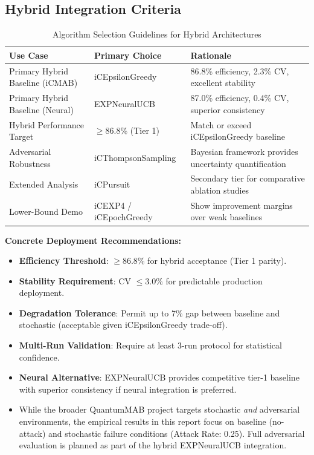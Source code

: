 \documentclass[12pt,a4paper]{article}
\begin{document}
\subsection{Hybrid Integration Criteria}

\begin{table}[H]
\centering
\caption{Algorithm Selection Guidelines for Hybrid Architectures}
\begin{tabular}{@{}lll@{}}
\toprule
\textbf{Use Case} & \textbf{Primary Choice} & \textbf{Rationale} \\
\midrule
Primary Hybrid Baseline (iCMAB) & iCEpsilonGreedy & 86.8\% efficiency, 2.3\% CV, excellent stability \\
Primary Hybrid Baseline (Neural) & EXPNeuralUCB & 87.0\% efficiency, 0.4\% CV, superior consistency \\
Hybrid Performance Target & $\geq$86.8\% (Tier 1) & Match or exceed iCEpsilonGreedy baseline \\
Adversarial Robustness & iCThompsonSampling & Bayesian framework provides uncertainty quantification \\
Extended Analysis & iCPursuit & Secondary tier for comparative ablation studies \\
Lower-Bound Demo & iCEXP4 / iCEpochGreedy & Show improvement margins over weak baselines \\
\bottomrule
\end{tabular}
\end{table}

\textbf{Concrete Deployment Recommendations:}
\begin{itemize}
\item \textbf{Efficiency Threshold}: $\geq$86.8\% for hybrid acceptance (Tier 1 parity).
\item \textbf{Stability Requirement}: CV $\leq$3.0\% for predictable production deployment.
\item \textbf{Degradation Tolerance}: Permit up to 7\% gap between baseline and stochastic (acceptable given iCEpsilonGreedy trade-off).
\item \textbf{Multi-Run Validation}: Require at least 3-run protocol for statistical confidence.
\item \textbf{Neural Alternative}: EXPNeuralUCB provides competitive tier-1 baseline with superior consistency if neural integration is preferred.
\item While the broader QuantumMAB project targets stochastic \emph{and} adversarial environments, the empirical results in this report focus on baseline (no-attack) and stochastic failure conditions (Attack Rate: 0.25). Full adversarial evaluation is planned as part of the hybrid EXPNeuralUCB integration.
\end{itemize}
\end{document}
